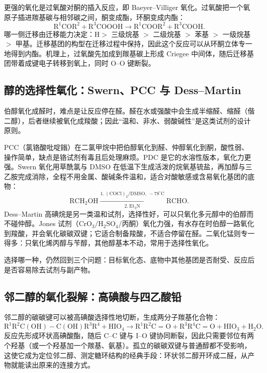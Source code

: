 \documentclass[UTF8]{ctexbook}
\begin{document}
更强的氧化是过氧酸对酮的插入反应，即 Baeyer--Villiger 氧化。过氧酸把一个氧原子插进羰基碳与相邻碳之间，酮变成酯，环酮变成内酯：
\[
\mathrm{R^1COR^2}+\mathrm{R^3COOOH}\longrightarrow
\mathrm{R^1COOR^2}+\mathrm{R^3COOH}.
\]
哪一侧迁移由迁移能力决定：$\mathrm{H>}$ 三级烷基 $>$ 二级烷基 $>$ 苯基 $>$ 一级烷基 $>$ 甲基。迁移基团的构型在迁移过程中保持，因此这个反应可以从环酮立体专一地得到内酯。机理上，过氧酸先加成到羰基碳上形成 Criegee 中间体，随后迁移基团带着成键电子转移到氧上，同时 O--O 键断裂。

\subsection{醇的选择性氧化：Swern、PCC 与 Dess--Martin}

伯醇氧化成醛时，难点是让反应停在醛。醛在水或强酸中会生成半缩醛、缩醛（偕二醇），后者继续被氧化成羧酸；因此“温和、非水、弱酸碱性”是这类试剂的设计原则。

PCC（氯铬酸吡啶鎓）在二氯甲烷中把伯醇氧化到醛、仲醇氧化到酮，酸性弱、操作简单，缺点是铬试剂有毒且后处理麻烦。PDC 是它的水溶性版本，氧化力更强。Swern 氧化用草酰氯与 DMSO 在低温下生成活泼的烷氧基锍盐，再加醇与三乙胺完成消除，全程不用金属、酸碱条件温和，适合对酸敏感或含易氧化基团的底物：
\[
\mathrm{RCH_2OH}\xrightarrow[\text{2.}\ \mathrm{Et_3N}]{\text{1.}\ \mathrm{(COCl)_2/DMSO},\ -78^\circ\mathrm{C}}
\mathrm{RCHO}.
\]
Dess--Martin 高碘烷是另一类温和试剂，选择性好，可以只氧化多元醇中的伯醇而不碰仲醇。Jones 试剂（$\mathrm{CrO_3/H_2SO_4}$/丙酮）氧化力强，有水存在时伯醇一路氧化到羧酸，并会氧化碳碳双键；它适合制备羧酸，不适合停留在醛。二氧化锰则专一得多：只氧化烯丙醇与苄醇，其他醇基本不动，常用于选择性氧化。

选择哪一种，仍然回到三个问题：目标氧化态、底物中其他基团是否耐受、反应后是否容易除去试剂与副产物。

\subsection{邻二醇的氧化裂解：高碘酸与四乙酸铅}

邻二醇的碳碳键可以被高碘酸选择性地切断，生成两分子羰基化合物：
\[
\mathrm{R^1R^2C(OH){-}C(OH)R^3R^4}+\mathrm{HIO_4}
\longrightarrow \mathrm{R^1R^2C=O}+\mathrm{R^3R^4C=O}+\mathrm{HIO_3}+\mathrm{H_2O}.
\]
反应先形成环状高碘酸酯，随后 C--C 键与 I--O 键协同断裂，因此只需要邻位有两个羟基（或一个羟基加一个羰基、氨基）。孤立的碳碳双键与普通醇都不受影响，这使它成为定位邻二醇、测定糖环结构的经典手段：环状邻二醇开环成二醛，从产物就能读出原来的连接方式。
\end{document}
